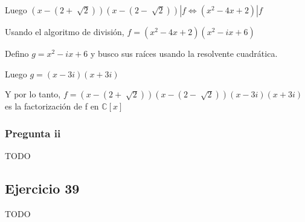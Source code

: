 Luego $ (x-(2+\sqrt[]{2}))(x-(2-\sqrt[]{2})) | f \iff (x^2 - 4x + 2) |f $

Usando el algoritmo de división, $ f = (x^2 - 4x + 2)(x^2 - ix + 6) $

Defino $ g = x^2 -ix + 6 $ y busco sus raíces usando la resolvente cuadrática.

Luego $ g = (x-3i)(x+3i) $

Y por lo tanto, $ f = (x-(2+\sqrt[]{2}))(x-(2-\sqrt[]{2}))(x-3i)(x+3i) $ es la factorización de f en $ \mathbb{C}[x] $

\subsubsection{Pregunta ii}
TODO

\subsection{Ejercicio 39}
TODO


